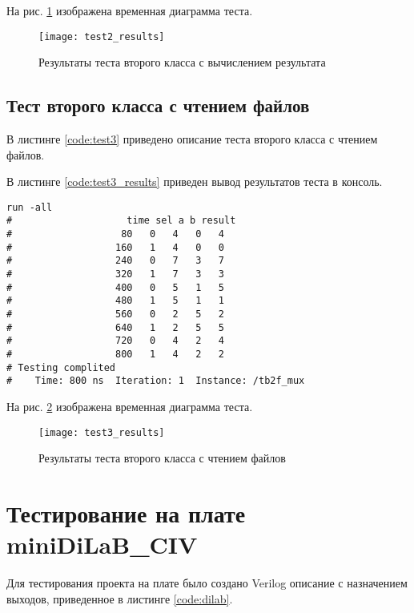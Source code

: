 На рис. \ref{fig:test2_results} изображена временная диаграмма теста.
\begin{figure}[H]
	\begin{center}
		\texttt{[image: test2\_results]}
		\caption{Результаты теста второго класса с вычислением результата}
		\label{fig:test2_results}
	\end{center}
\end{figure}
\vspace{-1cm}

\subsection{Тест второго класса с чтением файлов}

В листинге \ref{code:test3} приведено описание теста второго класса с чтением файлов.


В листинге \ref{code:test3_results} приведен вывод результатов теста в консоль.
\begin{lstlisting}[caption=Результаты теста второго класса с чтением файлов, label=code:test3_results, language={}]
run -all
# 		             time sel a b result
#                   80   0   4   0   4
#                  160   1   4   0   0
#                  240   0   7   3   7
#                  320   1   7   3   3
#                  400   0   5   1   5
#                  480   1   5   1   1
#                  560   0   2   5   2
#                  640   1   2   5   5
#                  720   0   4   2   4
#                  800   1   4   2   2
# Testing complited
#    Time: 800 ns  Iteration: 1  Instance: /tb2f_mux
\end{lstlisting}

На рис. \ref{fig:test3_results} изображена временная диаграмма теста.
\begin{figure}[H]
	\begin{center}
		\texttt{[image: test3\_results]}
		\caption{Результаты теста второго класса с чтением файлов}
		\label{fig:test3_results}
	\end{center}
\end{figure}

\section{Тестирование на плате miniDiLaB\_CIV}

Для тестирования проекта на плате было создано Verilog описание с назначением выходов, приведенное в листинге  \ref{code:dilab}.


